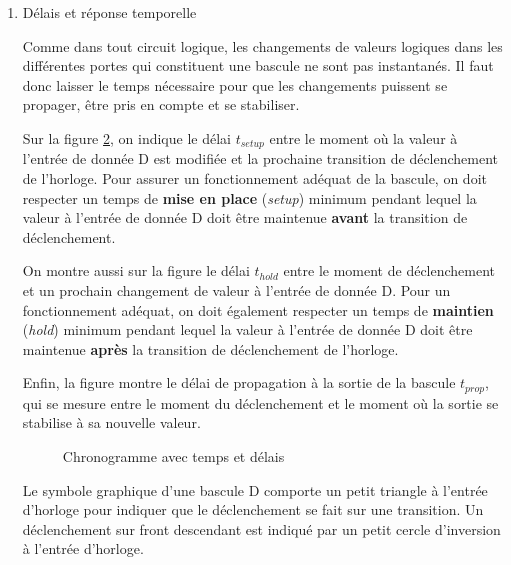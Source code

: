 \documentclass[letter, oneside]{book}
\begin{document}
\begin{enumerate}
La figure \ref{fig:org8c1a277} présente un chronogramme qui montre la bascule
qui passe de l'état 0 à l'état 1 et retourne, au cycle suivant, à
l'état 0.

\begin{figure}[htbp]
\centering

\caption{\label{fig:org8c1a277}Chronogramme pour une bascule D}
\end{figure}

\item Délais et réponse temporelle
\label{sec:orga07f8b4}

Comme dans tout circuit logique, les changements de valeurs logiques
dans les différentes portes qui constituent une bascule ne sont pas
instantanés. Il faut donc laisser le temps nécessaire pour que les
changements puissent se propager, être pris en compte et se stabiliser.

Sur la figure \ref{fig:org8fd78cf}, on indique le délai \(t_{setup}\) entre le
moment où la valeur à l'entrée de donnée D est modifiée et la
prochaine transition de déclenchement de l'horloge. Pour assurer un
fonctionnement adéquat de la bascule, on doit respecter un temps de
\textbf{mise en place} (\emph{setup}) minimum pendant lequel la valeur à l'entrée
de donnée D doit être maintenue \textbf{avant} la transition de
déclenchement.

On montre aussi sur la figure le délai \(t_{hold}\) entre le moment de
déclenchement et un prochain changement de valeur à l'entrée de
donnée D. Pour un fonctionnement adéquat, on doit également respecter
un temps de \textbf{maintien} (\emph{hold}) minimum pendant lequel la valeur à
l'entrée de donnée D doit être maintenue \textbf{après} la transition de
déclenchement de l'horloge.

Enfin, la figure montre le délai de propagation à la sortie de la
bascule \(t_{prop}\), qui se mesure entre le moment du déclenchement et
le moment où la sortie se stabilise à sa nouvelle valeur.

\begin{figure}[htbp]
\centering

\caption{\label{fig:org8fd78cf}Chronogramme avec temps et délais}
\end{figure}

Le symbole graphique d'une bascule D comporte un petit triangle à
l'entrée d'horloge pour indiquer que le déclenchement se fait sur une
transition. Un déclenchement sur front descendant est indiqué par un
petit cercle d'inversion à l'entrée d'horloge.


\end{enumerate}
\end{document}
